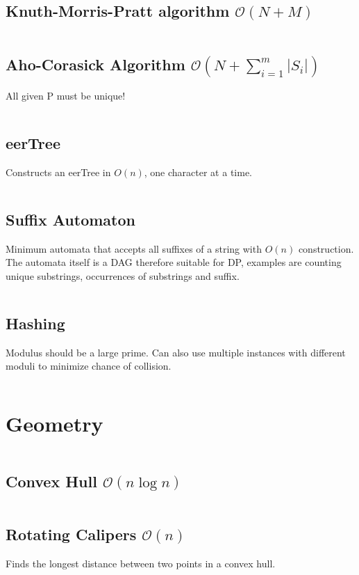 \documentclass[8pt,a4paper,landscape,oneside]{amsart}
\newcommand{\code}[1]{\inputminted[fontsize=\normalsize,baselinestretch=1,breaklines,tabsize=2]{cpp}{code/#1}}
\begin{document}
\begin{multicols*}{3}
\subsection{Knuth-Morris-Pratt algorithm $\mathcal{O}(N + M)$}
\code{strings/kmp.cpp}

\subsection{Aho-Corasick Algorithm $\mathcal{O}(N + \sum_{i=1}^{m} |S_i|)$}
All given P must be unique!
\code{strings/aho_corasick.cpp}

\subsection{eerTree}
	Constructs an eerTree in $O(n)$, one character at a time.
	\code{strings/eertree.cpp}

\subsection{Suffix Automaton}
	Minimum automata that accepts all suffixes of a string with $O(n)$
	construction. The automata itself is a DAG therefore suitable for DP,
	examples are counting unique substrings, occurrences of substrings and
	suffix.
	\code{strings/suffix_automaton.cpp}

\subsection{Hashing}
	Modulus should be a large prime. Can also use multiple instances with
	different moduli to minimize chance of collision.
	\code{strings/hasher.cpp}

\section{Geometry}
\code{geometry/main.cpp}

\subsection{Convex Hull $\mathcal{O}(n \log n)$}
\code{geometry/convex_hull.cpp}

\subsection{Rotating Calipers $\mathcal{O}(n)$}
Finds the longest distance between two points in a convex hull.
\code{geometry/rotating_calipers.cpp}


\end{multicols*}
\end{document}
